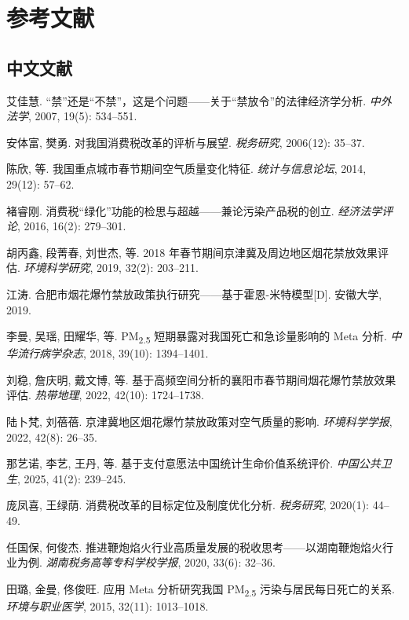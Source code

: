 \section*{参考文献}

\begin{list}{}{\setlength{\leftmargin}{2.2em}\setlength{\itemindent}{-2.2em}\setlength{\itemsep}{0.35em}\raggedright\sloppy}

\subsection*{中文文献}

\item 艾佳慧. “禁”还是“不禁”，这是个问题——关于“禁放令”的法律经济学分析. \emph{中外法学}, 2007, 19(5): 534--551.
\item 安体富, 樊勇. 对我国消费税改革的评析与展望. \emph{税务研究}, 2006(12): 35--37.
\item 陈欣, 等. 我国重点城市春节期间空气质量变化特征. \emph{统计与信息论坛}, 2014, 29(12): 57--62.
\item 褚睿刚. 消费税“绿化”功能的检思与超越——兼论污染产品税的创立. \emph{经济法学评论}, 2016, 16(2): 279--301.
\item 胡丙鑫, 段菁春, 刘世杰, 等. 2018 年春节期间京津冀及周边地区烟花禁放效果评估. \emph{环境科学研究}, 2019, 32(2): 203--211.
\item 江涛. 合肥市烟花爆竹禁放政策执行研究——基于霍恩-米特模型[D]. 安徽大学, 2019.
\item 李曼, 吴瑶, 田耀华, 等. PM\textsubscript{2.5} 短期暴露对我国死亡和急诊量影响的 Meta 分析. \emph{中华流行病学杂志}, 2018, 39(10): 1394--1401.
\item 刘稳, 詹庆明, 戴文博, 等. 基于高频空间分析的襄阳市春节期间烟花爆竹禁放效果评估. \emph{热带地理}, 2022, 42(10): 1724--1738.
\item 陆卜梵, 刘蓓蓓. 京津冀地区烟花爆竹禁放政策对空气质量的影响. \emph{环境科学学报}, 2022, 42(8): 26--35.
\item 那艺诺, 李艺, 王丹, 等. 基于支付意愿法中国统计生命价值系统评价. \emph{中国公共卫生}, 2025, 41(2): 239--245.
\item 庞凤喜, 王绿荫. 消费税改革的目标定位及制度优化分析. \emph{税务研究}, 2020(1): 44--49.
\item 任国保, 何俊杰. 推进鞭炮焰火行业高质量发展的税收思考——以湖南鞭炮焰火行业为例. \emph{湖南税务高等专科学校学报}, 2020, 33(6): 32--36.
\item 田璐, 金曼, 佟俊旺. 应用 Meta 分析研究我国 PM\textsubscript{2.5} 污染与居民每日死亡的关系. \emph{环境与职业医学}, 2015, 32(11): 1013--1018.


\end{list}
